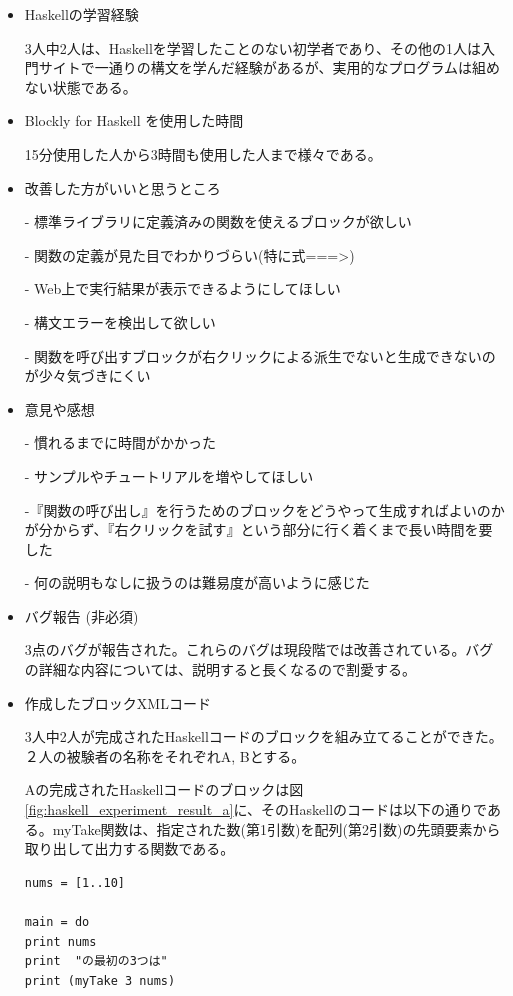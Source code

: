 \documentclass{risepaper}
\begin{document}
\begin{itemize}
\item Haskellの学習経験

3人中2人は、Haskellを学習したことのない初学者であり、その他の1人は入門サイトで一通りの構文を学んだ経験があるが、実用的なプログラムは組めない状態である。

\item Blockly for Haskell を使用した時間

15分使用した人から3時間も使用した人まで様々である。

\item 改善した方がいいと思うところ

- 標準ライブラリに定義済みの関数を使えるブロックが欲しい

- 関数の定義が見た目でわかりづらい(特に式===\textgreater)

- Web上で実行結果が表示できるようにしてほしい

- 構文エラーを検出して欲しい

- 関数を呼び出すブロックが右クリックによる派生でないと生成できないのが少々気づきにくい

\item 意見や感想

- 慣れるまでに時間がかかった

- サンプルやチュートリアルを増やしてほしい

-『関数の呼び出し』を行うためのブロックをどうやって生成すればよいのかが分からず、『右クリックを試す』という部分に行く着くまで長い時間を要した

- 何の説明もなしに扱うのは難易度が高いように感じた

\item バグ報告 (非必須)

3点のバグが報告された。これらのバグは現段階では改善されている。バグの詳細な内容については、説明すると長くなるので割愛する。
\item 作成したブロックXMLコード

3人中2人が完成されたHaskellコードのブロックを組み立てることができた。２人の被験者の名称をそれぞれA, Bとする。

Aの完成されたHaskellコードのブロックは図\ref{fig:haskell_experiment_result_a}に、そのHaskellのコードは以下の通りである。myTake関数は、指定された数(第1引数)を配列(第2引数)の先頭要素から取り出して出力する関数である。
\begin{lstlisting}[basicstyle=\ttfamily\footnotesize]
nums = [1..10]

main = do
print nums
print  "の最初の3つは"
print (myTake 3 nums)


\end{lstlisting}
\end{itemize}
\end{document}
